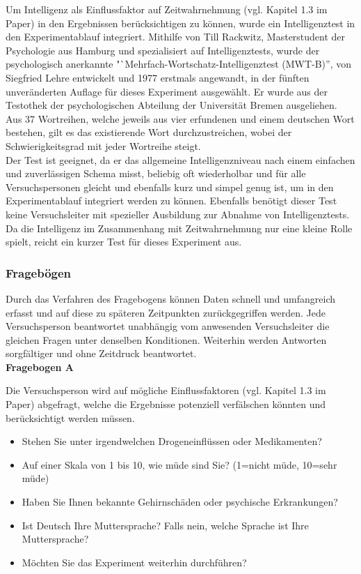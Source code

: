 \documentclass{Bericht}
\begin{document}
Um Intelligenz als Einflussfaktor auf Zeitwahrnehmung (vgl. Kapitel 1.3 im Paper) in den Ergebnissen berücksichtigen zu können, wurde ein Intelligenztest in den Experimentablauf integriert.
Mithilfe von Till Rackwitz, Masterstudent der Psychologie aus Hamburg und spezialisiert auf Intelligenztests, wurde der psychologisch anerkannte "`Mehrfach-Wortschatz-Intelligenztest (MWT-B)'', von Siegfried Lehre entwickelt und 1977 erstmals angewandt, in der fünften unveränderten Auflage für dieses Experiment ausgewählt. Er wurde aus der Testothek der psychologischen Abteilung der Universität Bremen ausgeliehen.\\
Aus 37 Wortreihen, welche jeweils aus vier erfundenen und einem deutschen Wort bestehen, gilt es das existierende Wort durchzustreichen, wobei der Schwierigkeitsgrad mit jeder Wortreihe steigt.\\
Der Test ist geeignet, da er das allgemeine Intelligenzniveau nach einem einfachen und zuverlässigen Schema misst, beliebig oft wiederholbar und für alle Versuchspersonen gleicht und ebenfalls kurz und simpel genug ist, um in den Experimentablauf integriert werden zu können. Ebenfalls benötigt dieser Test keine Versuchsleiter mit spezieller Ausbildung zur Abnahme von Intelligenztests. 
Da die Intelligenz im Zusammenhang mit Zeitwahrnehmung nur eine kleine Rolle spielt, reicht ein kurzer Test für dieses Experiment aus. 
\subsubsection{Fragebögen}
Durch das Verfahren des Fragebogens können Daten schnell und umfangreich erfasst und auf diese zu späteren Zeitpunkten zurückgegriffen werden. Jede Versuchsperson beantwortet unabhängig vom anwesenden Versuchsleiter die gleichen Fragen unter denselben Konditionen. Weiterhin werden Antworten sorgfältiger und ohne Zeitdruck beantwortet.\\

\label{subsec:fragebogen}
\textbf{Fragebogen A}

Die Versuchsperson wird auf mögliche Einflussfaktoren (vgl. Kapitel 1.3 im Paper) abgefragt, welche die Ergebnisse potenziell verfälschen könnten und berücksichtigt werden müssen.
\begin{itemize}
	\setlength{\itemsep}{0em}
	\item Stehen Sie unter irgendwelchen Drogeneinflüssen oder Medikamenten?
	\item Auf einer Skala von 1 bis 10, wie müde sind Sie? (1=nicht müde, 10=sehr müde)
	\item Haben Sie Ihnen bekannte Gehirnschäden oder psychische Erkrankungen?
	\item Ist Deutsch Ihre Muttersprache? Falls nein, welche Sprache ist Ihre Muttersprache?
	\item Möchten Sie das Experiment weiterhin durchführen?
\end{itemize}
\end{document}

